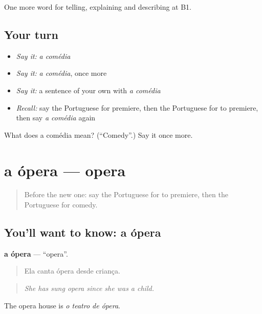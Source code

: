 \begin{grammarlens}[title={What you've built}]
One more word for telling, explaining and describing at B1.
\end{grammarlens}

\subsection*{Your turn}
\begin{itemize}
\raggedright
  \item \emph{Say it:} \emph{a comédia}
  \item \emph{Say it:} \emph{a comédia}, once more
  \item \emph{Say it:} a sentence of your own with \emph{a comédia}
  \item \emph{Recall:} say the Portuguese for premiere, then the Portuguese for to premiere, then say \emph{a comédia} again
\end{itemize}

\begin{tcolorbox}[breakable,colback=teal!4,colframe=teal!35!black,title={Before you move on}]
What does a comédia mean? (\textquotedblleft{}Comedy\textquotedblright{}.) Say it once more.
\end{tcolorbox}
\section[a ópera]{a ópera — opera}

\label{lesson:PT-C521-opera}



\begin{quote}
Before the new one: say the Portuguese for to premiere, then the Portuguese for comedy.
\end{quote}

\subsection*{You'll want to know: a ópera}
\textbf{a ópera} — \textquotedblleft{}opera\textquotedblright{}.

\begin{quote}
Ela canta ópera desde criança.
\end{quote}

\begin{quote}
\emph{She has sung opera since she was a child.}
\end{quote}

The opera house is \emph{o teatro de ópera}.

